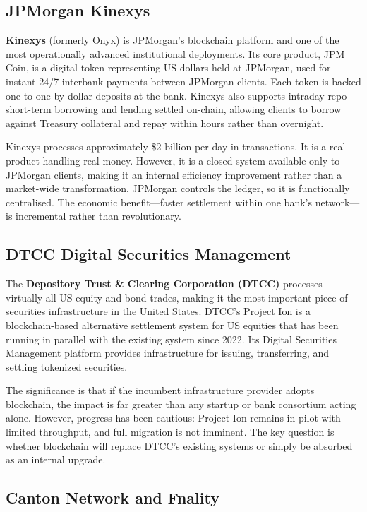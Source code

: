 \documentclass[11pt,a4paper]{article}
\newcommand{\keyword}[1]{\textbf{\textcolor{AccentOrange}{#1}}}
\begin{document}
\subsection{JPMorgan Kinexys}

\keyword{Kinexys} (formerly Onyx) is JPMorgan's blockchain platform and one of the most operationally advanced institutional deployments. Its core product, JPM Coin, is a digital token representing US dollars held at JPMorgan, used for instant 24/7 interbank payments between JPMorgan clients. Each token is backed one-to-one by dollar deposits at the bank. Kinexys also supports intraday repo---short-term borrowing and lending settled on-chain, allowing clients to borrow against Treasury collateral and repay within hours rather than overnight.

Kinexys processes approximately \$2 billion per day in transactions. It is a real product handling real money. However, it is a closed system available only to JPMorgan clients, making it an internal efficiency improvement rather than a market-wide transformation. JPMorgan controls the ledger, so it is functionally centralised. The economic benefit---faster settlement within one bank's network---is incremental rather than revolutionary.

\subsection{DTCC Digital Securities Management}

The \keyword{Depository Trust \& Clearing Corporation (DTCC)} processes virtually all US equity and bond trades, making it the most important piece of securities infrastructure in the United States. DTCC's Project Ion is a blockchain-based alternative settlement system for US equities that has been running in parallel with the existing system since 2022. Its Digital Securities Management platform provides infrastructure for issuing, transferring, and settling tokenized securities.

The significance is that if the incumbent infrastructure provider adopts blockchain, the impact is far greater than any startup or bank consortium acting alone. However, progress has been cautious: Project Ion remains in pilot with limited throughput, and full migration is not imminent. The key question is whether blockchain will replace DTCC's existing systems or simply be absorbed as an internal upgrade.

\subsection{Canton Network and Fnality}
\end{document}
